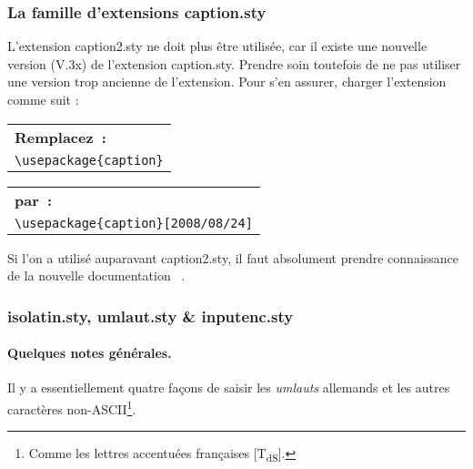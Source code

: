 \documentclass[fontsize=11pt, paper=a4, pagesize, captions=tableheading, numbers=enddot, toc=graduated, footnotes=multiple]{scrartcl}%
\makeatletter
\newcommand{\Paket}[1]{\textsf{#1.sty}\xspace}
\newcommand{\PakeH}[1]{#1.sty\xspace}
\newenvironment{Ers}[1][\linewidth]{%
  \par\bigskip\noindent\marginline{\textcolor{gruen}{\boldmath $\triangleright$}}\begin{tabular}[t]{@{}p{0.5\textwidth}@{}}\textcolor{rot}{\textbf{\textsf{Remplacez~:}}%
}\\[2pt] \rahmenpr[#1]}%
{\endrahmenpr\end{tabular}}
\newenvironment{Dur}[1][0.5\textwidth]{%
\noindent\begin{tabular}[t]{@{}p{0.5\textwidth - 0.5em}@{}}\textcolor{gruen}{\textbf{\textsf{par~:}}}\\[2pt]\rahmenpg[#1]}%
{\endrahmenpg\end{tabular}\smallskip\noindent}
\newcommand{\NDT}{[T\textsubscript{dS}].} %
\makeatother
\begin{document}
\subsubsection{La famille d’extensions \PakeH{caption}}
\label{sec:die-caption-famile}
L’extension \Paket{caption2} ne doit plus être utilisée, car il existe une nouvelle version (V.3x) de l’extension \Paket{caption}. Prendre soin toutefois de ne pas utiliser une version trop ancienne de l’extension. Pour s’en assurer, charger l’extension comme suit :
\begin{Ers}
  \verb+\usepackage{caption}+
\end{Ers}
\begin{Dur}
  \verb+\usepackage{caption}[2008/08/24]+
\end{Dur}

Si l’on a utilisé auparavant \Paket{caption2}, il faut absolument prendre connaissance de la nouvelle documentation ~\cite[Section~C.2]{caption-11}.

\subsubsection{\Paket{isolatin}, \Paket{umlaut} \& \Paket{inputenc}}
\label{sec:eingabe-von-umlauten}

\paragraph{Quelques notes générales.}
\label{sec:generelles}
Il y a essentiellement quatre façons de saisir les \emph{umlauts} allemands et les autres caractères non-ASCII\footnote{Comme les lettres accentuées françaises \NDT}.
\end{document}
